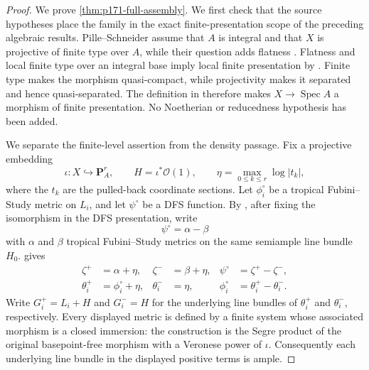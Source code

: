 \begin{proof}
We prove \cref{thm:p171-full-assembly}.  We first check that the source
hypotheses place the family in the exact
finite-presentation scope of the preceding algebraic results.
Pille--Schneider assume that \(A\) is integral and that \(X\) is projective
of finite type over \(A\), while their question adds flatness
\cite[Section~2 and Question~4.9]{PS23Hybrid}.  Flatness and local finite
type over an integral base imply local finite presentation by
\cite[Tag~05IN]{stacks-project}.  Finite type makes the
morphism quasi-compact, while projectivity makes it separated and hence
quasi-separated.  The definition in \cite[Tag~01TP]{stacks-project}
therefore makes
\(X\to\operatorname{Spec}A\) a morphism of finite presentation.  No
Noetherian or reducedness hypothesis has been added.

We separate the finite-level assertion from the density passage.  Fix a
projective embedding
\[
 \iota:X\hookrightarrow\mathbf P_A^r,
 \qquad H=\iota^*\mathcal O(1),
 \qquad \eta=\max_{0\leq k\leq r}\log|t_k|,
\]
where the \(t_k\) are the pulled-back coordinate sections.  Let
\(\phi_i^\circ\) be a tropical Fubini--Study metric on \(L_i\), and let
\(\psi^\circ\) be a DFS function.  By
\cite[Definition~2.15]{PS23Hybrid}, after fixing the isomorphism in the
DFS presentation,
write
\[
 \psi^\circ=\alpha-\beta
\]
with \(\alpha\) and \(\beta\) tropical Fubini--Study metrics on the same
semiample line bundle \(H_0\).
 gives
\begin{align}
 \zeta^+&=\alpha+\eta,&
 \zeta^-&=\beta+\eta,&
 \psi^\circ&=\zeta^+-\zeta^-,
 \label{eq:p171-full-dfs-expansion}\\
 \theta_i^+&=\phi_i^\circ+\eta,&
 \theta_i^-&=\eta,&
 \phi_i^\circ&=\theta_i^+-\theta_i^-.
 \label{eq:p171-full-fs-expansion}
\end{align}
Write \(G_i^+=L_i+H\) and \(G_i^-=H\) for the underlying line
bundles of \(\theta_i^+\) and \(\theta_i^-\), respectively.
Every displayed metric is defined by a finite system whose associated
morphism is a closed immersion: the construction is the Segre product of
the original basepoint-free morphism with a Veronese power of \(\iota\).
Consequently each underlying line bundle in the displayed positive terms
is ample.


\end{proof}
